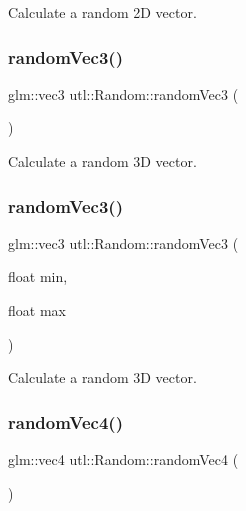Calculate a random 2D vector. \mbox{\label{classutl_1_1_random_a6e2aaa6b6117cfe92312af1153adc808}} 
\subsubsection{\texorpdfstring{random\+Vec3()}{randomVec3()}\hspace{0.1cm}{\footnotesize\ttfamily [1/2]}}
{\footnotesize\ttfamily glm\+::vec3 utl\+::\+Random\+::random\+Vec3 (\begin{DoxyParamCaption}{ }\end{DoxyParamCaption})\hspace{0.3cm}{\ttfamily [static]}}

Calculate a random 3D vector. \mbox{\label{classutl_1_1_random_ae52ea617bc38ca85a9eb4cdc029b371c}} 
\subsubsection{\texorpdfstring{random\+Vec3()}{randomVec3()}\hspace{0.1cm}{\footnotesize\ttfamily [2/2]}}
{\footnotesize\ttfamily glm\+::vec3 utl\+::\+Random\+::random\+Vec3 (\begin{DoxyParamCaption}\item[{float}]{min,  }\item[{float}]{max }\end{DoxyParamCaption})\hspace{0.3cm}{\ttfamily [static]}}

Calculate a random 3D vector. \mbox{\label{classutl_1_1_random_abab1cbc6931823c0449b53210292527f}} 
\subsubsection{\texorpdfstring{random\+Vec4()}{randomVec4()}\hspace{0.1cm}{\footnotesize\ttfamily [1/2]}}
{\footnotesize\ttfamily glm\+::vec4 utl\+::\+Random\+::random\+Vec4 (\begin{DoxyParamCaption}{ }\end{DoxyParamCaption})\hspace{0.3cm}{\ttfamily [static]}}

